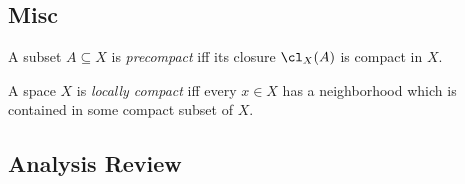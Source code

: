 \hypertarget{misc}{%
\subsection{Misc}\label{misc}}

\begin{description}
\tightlist
\item[Definition (Precompact)]
A subset \(A\subseteq X\) is \emph{precompact} iff its closure
\(\cl_X(A)\) is compact in \(X\).
\item[Definition (Locally Compact]
A space \(X\) is \emph{locally compact} iff every \(x\in X\) has a
neighborhood which is contained in some compact subset of \(X\).
\end{description}

\hypertarget{analysis-review}{%
\subsection{Analysis Review}\label{analysis-review}}

